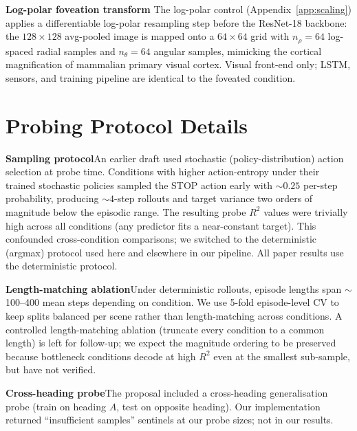 \documentclass{article}
\begin{document}
\noindent\textbf{Log-polar foveation transform}\quad
The log-polar control (Appendix~\ref{app:scaling}) applies a differentiable log-polar resampling step before the ResNet-18 backbone: the $128{\times}128$ avg-pooled image is mapped onto a $64{\times}64$ grid with $n_\rho{=}64$ log-spaced radial samples and $n_\theta{=}64$ angular samples, mimicking the cortical magnification of mammalian primary visual cortex. Visual front-end only; LSTM, sensors, and training pipeline are identical to the foveated condition.


\section{Probing Protocol Details}
\label{app:probing-details}

\noindent\textbf{Sampling protocol}\quad An earlier draft used stochastic (policy-distribution) action selection at probe time. Conditions with higher action-entropy under their trained stochastic policies sampled the STOP action early with $\sim 0.25$ per-step probability, producing $\sim 4$-step rollouts and target variance two orders of magnitude below the episodic range. The resulting probe $R^2$ values were trivially high across all conditions (any predictor fits a near-constant target). This confounded cross-condition comparisons; we switched to the deterministic (argmax) protocol used here and elsewhere in our pipeline. All paper results use the deterministic protocol.

\noindent\textbf{Length-matching ablation}\quad Under deterministic rollouts, episode lengths span $\sim$100--400 mean steps depending on condition. We use 5-fold episode-level CV to keep splits balanced per scene rather than length-matching across conditions. A controlled length-matching ablation (truncate every condition to a common length) is left for follow-up; we expect the magnitude ordering to be preserved because bottleneck conditions decode at high $R^2$ even at the smallest sub-sample, but have not verified.

\noindent\textbf{Cross-heading probe}\quad The proposal included a cross-heading generalisation probe (train on heading $A$, test on opposite heading). Our implementation returned ``insufficient samples'' sentinels at our probe sizes; not in our results.
\end{document}
